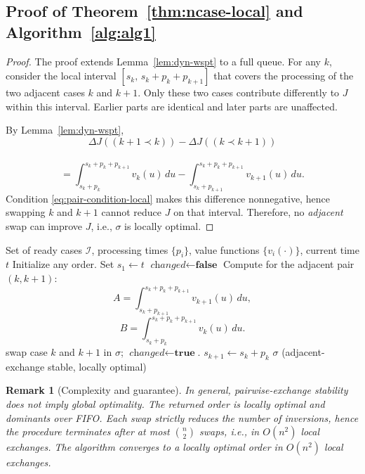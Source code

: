 \documentclass[letterpaper]{article}
\newtheorem{remark}{Remark}
\begin{document}
\subsection{Proof of Theorem~\ref{thm:ncase-local} and Algorithm~\ref{alg:alg1}}
\begin{proof}
The proof extends Lemma~\ref{lem:dyn-wspt} to a full queue.
For any $k$, consider the local interval
$[s_k,\,s_k+p_{k}+p_{{k+1}}]$ that covers the processing of the two
adjacent cases $k$ and ${k+1}$.
Only these two cases contribute differently to $J$ within this interval. Earlier parts are identical and later parts are unaffected.

By Lemma~\ref{lem:dyn-wspt},
\[
\Delta J(({k+1}\prec k))-\Delta J((k\prec {k+1}))
\]
\\
\[
=\int_{s_k+p_{k}}^{s_k+p_{k}+p_{{k+1}}}\! v_{k}(u)\,du
-\int_{s_k+p_{{k+1}}}^{s_k+p_{k}+p_{{k+1}}}\! v_{{k+1}}(u)\,du.
\]
Condition \eqref{eq:pair-condition-local} makes this difference nonnegative,
hence swapping $k$ and ${k+1}$ cannot reduce $J$ on that interval.
Therefore, no \emph{adjacent} swap can improve $J$, i.e., $\sigma$ is locally optimal.
\end{proof}




\begin{algorithm}[t!]
\caption{Dynamic Local Reordering of Cases}
\label{alg:alg1}
\begin{algorithmic}
\Require Set of ready cases $\mathcal{I}$, processing times $\{p_i\}$, value functions $\{v_i(\cdot)\}$, current time $t$
\State Initialize any order. Set $s_1\gets t$
\Repeat
  \State $\textit{changed}\gets \textbf{false}$
    \State Compute for the adjacent pair $(k,{k+1})$:
      \[
      A = \int_{s_k+p_{{k+1}}}^{s_k+p_{k}+p_{{k+1}}} v_{{k+1}}(u)\,du ,
      \]
      \[
      B = \int_{s_k+p_{k}}^{s_k+p_{k}+p_{{k+1}}} v_{k}(u)\,du.
      \]
        \State swap case $k$ and ${k+1}$ in $\sigma$;
        \State $\textit{changed}\gets \textbf{true}$.
    \EndIf
    \State $s_{k+1}\gets s_k+p_{k}$
  \EndFor
{}
\State \Return $\sigma$ \quad (adjacent-exchange stable, locally optimal)
\end{algorithmic}
\end{algorithm}


\begin{remark}[Complexity and guarantee]
In general, pairwise-exchange stability \emph{does not} imply global optimality. The returned order is \emph{locally optimal} and dominants over FIFO.
Each swap strictly reduces the number of inversions, hence the procedure terminates after at most $\binom{n}{2}$ swaps, i.e., in $O(n^2)$ local exchanges.
The algorithm converges to a locally optimal order in $O(n^2)$ local exchanges.
\end{remark}
\end{document}
